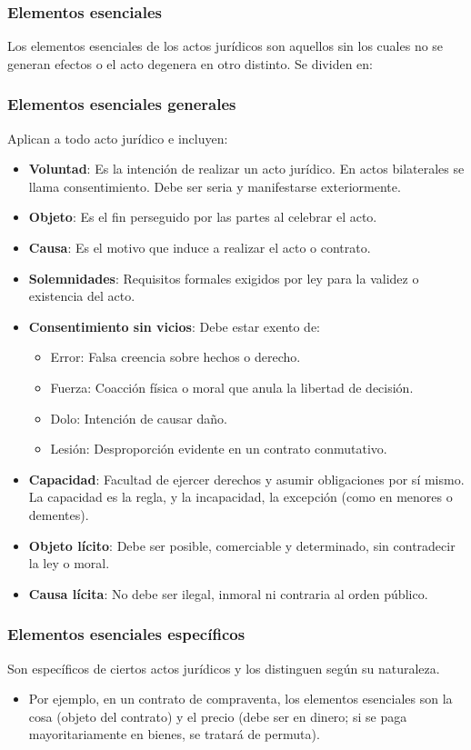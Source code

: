 \documentclass{templateNote}
\begin{document}
\subsubsection{Elementos esenciales}
Los elementos esenciales de los actos jurídicos son aquellos sin los cuales no se generan efectos o el acto degenera en otro distinto. Se dividen en:

\subsubsection*{Elementos esenciales generales}
Aplican a todo acto jurídico e incluyen:
\begin{itemize}
    \item \textbf{Voluntad}: Es la intención de realizar un acto jurídico. En actos bilaterales se llama consentimiento. Debe ser seria y manifestarse exteriormente.
    \item \textbf{Objeto}: Es el fin perseguido por las partes al celebrar el acto.
    \item \textbf{Causa}: Es el motivo que induce a realizar el acto o contrato.
    \item \textbf{Solemnidades}: Requisitos formales exigidos por ley para la validez o existencia del acto.
    \item \textbf{Consentimiento sin vicios}: Debe estar exento de:
    \begin{itemize}
        \item Error: Falsa creencia sobre hechos o derecho.
        \item Fuerza: Coacción física o moral que anula la libertad de decisión.
        \item Dolo: Intención de causar daño.
        \item Lesión: Desproporción evidente en un contrato conmutativo.
    \end{itemize}
    \item \textbf{Capacidad}: Facultad de ejercer derechos y asumir obligaciones por sí mismo. La capacidad es la regla, y la incapacidad, la excepción (como en menores o dementes).
    \item \textbf{Objeto lícito}: Debe ser posible, comerciable y determinado, sin contradecir la ley o moral.
    \item \textbf{Causa lícita}: No debe ser ilegal, inmoral ni contraria al orden público.
\end{itemize}

\subsubsection*{Elementos esenciales específicos}
Son específicos de ciertos actos jurídicos y los distinguen según su naturaleza.
\begin{itemize}
    \item Por ejemplo, en un contrato de compraventa, los elementos esenciales son la cosa (objeto del contrato) y el precio (debe ser en dinero; si se paga mayoritariamente en bienes, se tratará de permuta).
\end{itemize}
\end{document}
